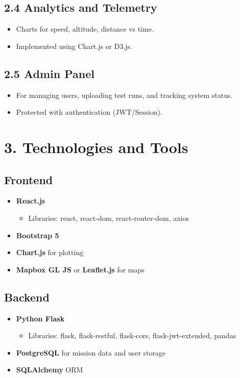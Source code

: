 \documentclass[12pt]{article}
\begin{document}
\subsection*{2.4 Analytics and Telemetry}
\begin{itemize}
    \item Charts for speed, altitude, distance vs time.
    \item Implemented using Chart.js or D3.js.
\end{itemize}

\subsection*{2.5 Admin Panel}
\begin{itemize}
    \item For managing users, uploading test runs, and tracking system status.
    \item Protected with authentication (JWT/Session).
\end{itemize}

\section*{3. Technologies and Tools}

\subsection*{Frontend}
\begin{itemize}
    \item \textbf{React.js}
        \begin{itemize}
            \item Libraries: react, react-dom, react-router-dom, axios
        \end{itemize}
    \item \textbf{Bootstrap 5}
    \item \textbf{Chart.js} for plotting
    \item \textbf{Mapbox GL JS} or \textbf{Leaflet.js} for maps
\end{itemize}

\subsection*{Backend}
\begin{itemize}
    \item \textbf{Python Flask}
        \begin{itemize}
            \item Libraries: flask, flask-restful, flask-cors, flask-jwt-extended, pandas
        \end{itemize}
    \item \textbf{PostgreSQL} for mission data and user storage
    \item \textbf{SQLAlchemy} ORM
\end{itemize}
\end{document}

